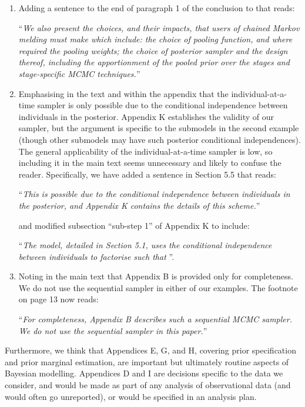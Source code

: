 \documentclass[
  10pt,
  a4paper,
]{article}
\begin{document}
\begin{enumerate}
\def\labelenumi{\arabic{enumi}.}
\item
  Adding a sentence to the end of paragraph 1 of the conclusion to that
  reads:

  ``\emph{We also present the choices, and their impacts, that users of
  chained Markov melding must make which include: the choice of pooling
  function, and where required the pooling weights; the choice of
  posterior sampler and the design thereof, including the apportionment
  of the pooled prior over the stages and stage-specific MCMC
  techniques.}''
\item
  Emphasising in the text and within the appendix that the
  individual-at-a-time sampler is only possible due to the conditional
  independence between individuals in the posterior. Appendix K
  establishes the validity of our sampler, but the argument is specific
  to the submodels in the second example (though other submodels may
  have such posterior conditional independences). The general
  applicability of the individual-at-a-time sampler is low, so including
  it in the main text seems unnecessary and likely to confuse the
  reader. Specifically, we have added a sentence in Section 5.5 that
  reads:

  ``\emph{This is possible due to the conditional independence between
  individuals in the posterior, and Appendix K contains the details of
  this scheme.}''

  and modified subsection ``sub-step 1'' of Appendix K to include:

  ``\emph{The model, detailed in Section 5.1, uses the conditional
  independence between individuals to factorise such that
  \textellipsis}''.
\item
  Noting in the main text that Appendix B is provided only for
  completeness. We do not use the sequential sampler in either of our
  examples. The footnote on page 13 now reads:

  ``\emph{For completeness, Appendix B describes such a sequential MCMC
  sampler. We do not use the sequential sampler in this paper.}''
\end{enumerate}

Furthermore, we think that Appendices E, G, and H, covering prior
specification and prior marginal estimation, are important but
ultimately routine aspects of Bayesian modelling. Appendices D and I are
decisions specific to the data we consider, and would be made as part of
any analysis of observational data (and would often go unreported), or
would be specified in an analysis plan.
\end{document}
